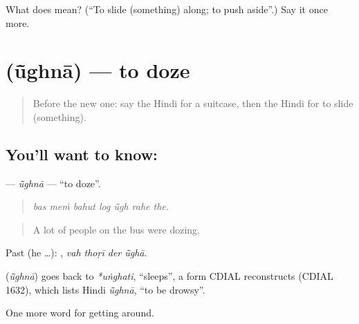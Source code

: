 \begin{tcolorbox}[breakable,colback=teal!4,colframe=teal!35!black,title={Before you move on}]
What does  mean? (\textquotedblleft{}To slide (something) along; to push aside\textquotedblright{}.) Say it once more.
\end{tcolorbox}
\section[\texorpdfstring{\hi{ऊँघना} (ū̃ghnā)}{ऊँघना (ū̃ghnā)}]{ (ū̃ghnā) — to doze}

\label{lesson:HI-C402-ughna}



\begin{quote}
Before the new one: say the Hindi for a suitcase, then the Hindi for to slide (something).
\end{quote}

\subsection*{You'll want to know: }
\textbf{} — \emph{ū̃ghnā} — \textquotedblleft{}to doze\textquotedblright{}.

\begin{quote}
      
\end{quote}

\begin{quote}
\emph{bas meṁ bahut log ū̃gh rahe the.}
\end{quote}

\begin{quote}
A lot of people on the bus were dozing.
\end{quote}

Past (he …):    , \emph{vah thoṛī der ū̃ghā}.

\begin{cousinweb}
\textbf{} (\emph{ū̃ghnā}) goes back to \emph{*uṅghati}, \textquotedblleft{}sleeps\textquotedblright{}, a form CDIAL reconstructs (CDIAL 1632), which lists Hindi \emph{ū̃ghnā}, \textquotedblleft{}to be drowsy\textquotedblright{}.
\end{cousinweb}

\begin{grammarlens}[title={What you've built}]
One more word for getting around.
\end{grammarlens}

